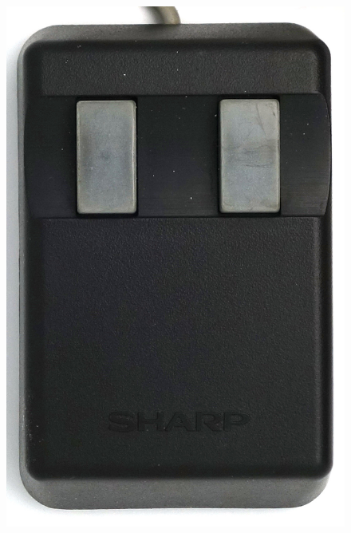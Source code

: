 \documentclass[11pt, a4paper]{article}
\begin{document}
\begin{figure}[h]
    \centering
    \includegraphics[scale=0.55]{1983_sharp_mz_1x10_mouse/top_15.jpg}

\end{figure}
\end{document}
